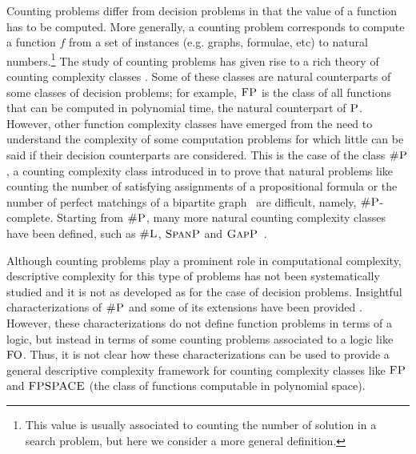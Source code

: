 Counting problems differ from decision problems in that the value of a function has to be computed.
More generally, a counting problem corresponds to compute a function $f$ from a set of instances (e.g. graphs, formulae, etc) to natural numbers.\footnote{This value is usually associated to counting the number of solution 
in a search problem, but here we consider a more general definition.} 
The study of counting problems has given rise to a rich theory of counting complexity classes \cite{HV95,F97,arora2009computational}. Some of these classes are natural counterparts of some classes of decision problems; for example, $\text{\sc FP}$ 
is the class of all functions that can be computed in polynomial time, 
the natural counterpart of $\text{\sc P}$.
However, other function complexity classes have emerged from the need to understand the complexity of some computation problems for which little can be said if their decision counterparts are considered. This is the case of the class $\text{\sc \#P}$, a counting complexity class introduced in \cite{Valiant79} to prove that natural problems like counting the number of satisfying assignments of a propositional formula or the number of perfect matchings of a bipartite graph~\cite{Valiant79} are difficult, namely, $\text{\sc \#P}$-complete.
Starting from $\text{\sc \#P}$,
many more natural 
counting complexity classes have been defined, such as 
$\text{\sc \#L}$, $\text{\sc SpanP}$ and $\text{\sc GapP}$~\cite{HV95,F97}.

Although counting problems play a prominent role in computational complexity, descriptive complexity for this type of problems has not been systematically studied and it is not as developed as for the case of decision problems. Insightful characterizations of $\text{\sc \#P}$ and some of its extensions have been provided \cite{SalujaST95,ComptonG96}. However, these characterizations do not define function problems in terms of a logic, but instead in terms of some counting problems associated to a logic like ${\rm FO}$. Thus, it is not clear how these characterizations can be used to provide a general descriptive complexity framework for counting complexity classes like $\text{\sc FP}$ and $\text{\sc FPSPACE}$ (the class of functions computable in polynomial space). 

